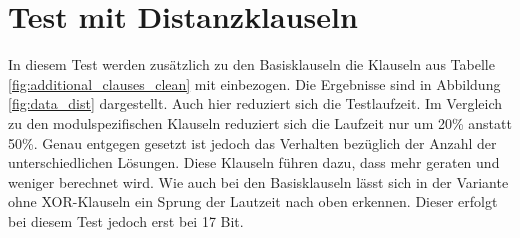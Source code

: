 \section{Test mit Distanzklauseln} %
\label{sec:test_distanz}

In diesem Test werden zusätzlich zu den Basisklauseln die Klauseln aus Tabelle  \ref{fig:additional_clauses_clean} mit einbezogen.
Die Ergebnisse sind in Abbildung \ref{fig:data_dist} dargestellt.
Auch hier reduziert sich die Testlaufzeit. Im Vergleich zu den modulspezifischen Klauseln reduziert sich die Laufzeit nur um 20\%
anstatt 50\%. Genau entgegen gesetzt ist jedoch das Verhalten bezüglich der Anzahl der unterschiedlichen Lösungen. Diese Klauseln
führen dazu, dass mehr geraten und weniger berechnet wird. Wie auch bei den Basisklauseln lässt sich in der Variante ohne XOR-Klauseln
ein Sprung der Lautzeit nach oben erkennen. Dieser erfolgt bei diesem Test jedoch erst bei 17 Bit.

